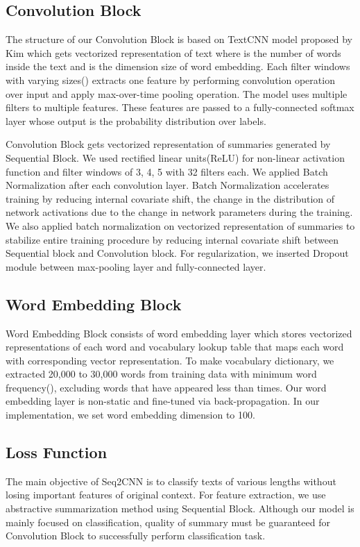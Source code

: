 \documentclass{article}
\begin{document}
\subsection{Convolution Block}
The structure of our Convolution Block is based on TextCNN model proposed by Kim\cite{DBLP:journals/corr/Kim14f} which gets  vectorized representation of text where  is the number of words inside the text and  is the dimension size of word embedding. Each filter windows with varying sizes() extracts one feature by performing  convolution operation over input and apply max-over-time pooling operation. The model uses multiple filters to multiple features. These features are passed to a fully-connected softmax layer whose output is the probability distribution over labels.

Convolution Block gets vectorized representation of summaries generated by Sequential Block. We used rectified linear units(ReLU)\cite{DBLP:journals/corr/XuWCL15} for non-linear activation function and filter windows of 3, 4, 5 with 32 filters each. We applied Batch Normalization\cite{Ioffe:2015:BNA:3045118.3045167} after each convolution layer. Batch Normalization\cite{Ioffe:2015:BNA:3045118.3045167} accelerates training by reducing internal covariate shift\cite{Ioffe:2015:BNA:3045118.3045167}, the change in the distribution of network activations due to the change in network parameters during the training. We also applied batch normalization on vectorized representation of summaries to stabilize entire training procedure by reducing internal covariate shift between Sequential block and Convolution block. For regularization, we inserted Dropout\cite{JMLR:v15:srivastava14a} module between max-pooling layer and fully-connected layer.

\subsection{Word Embedding Block}
Word Embedding Block consists of word embedding layer which stores vectorized representations of each word and vocabulary lookup table that maps each word with corresponding vector representation. To make vocabulary dictionary, we extracted 20,000 to 30,000 words from training data with minimum word frequency(), excluding words that have appeared less than  times. Our word embedding layer is non-static and fine-tuned via back-propagation. In our implementation, we set word embedding dimension to 100.

\subsection{Loss Function}
The main objective of Seq2CNN is to classify texts of various lengths without losing important features of original context. For feature extraction, we use abstractive summarization method using Sequential Block. Although our model is mainly focused on classification, quality of summary must be guaranteed for Convolution Block to successfully perform classification task. 
\end{document}

